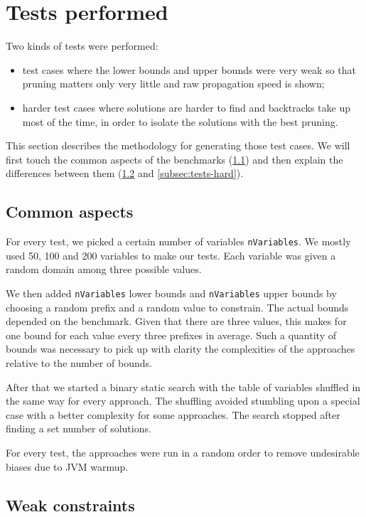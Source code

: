\documentclass[a4paper,10pt]{article}
\begin{document}
\section{Tests performed}

Two kinds of tests were performed:
\begin{itemize}
    \item test cases where the lower bounds and upper bounds were very weak so that pruning matters only very little and raw propagation speed is shown;
    \item harder test cases where solutions are harder to find and backtracks take up most of the time, in order to isolate the solutions with the best pruning.
\end{itemize}

This section describes the methodology for generating those test cases. We will first touch the common aspects of the benchmarks (\ref{subsec:tests-common}) and then explain the differences between them (\ref{subsec:tests-weak} and \ref{subsec:tests-hard}).

\subsection{Common aspects}
\label{subsec:tests-common}
For every test, we picked a certain number of variables \texttt{nVariables}. We mostly used 50, 100 and 200 variables to make our tests. Each variable was given a random domain among three possible values.

We then added \texttt{nVariables} lower bounds and \texttt{nVariables} upper bounds by choosing a random prefix and a random value to constrain. The actual bounds depended on the benchmark. Given that there are three values, this makes for one bound for each value every three prefixes in average. Such a quantity of bounds was necessary to pick up with clarity the complexities of the approaches relative to the number of bounds.

After that we started a binary static search with the table of variables shuffled in the same way for every approach. The shuffling avoided stumbling upon a special case with a better complexity for some approaches. The search stopped after finding a set number of solutions.

For every test, the approaches were run in a random order to remove undesirable biases due to JVM warmup.

\subsection{Weak constraints}
\label{subsec:tests-weak}
\end{document}
